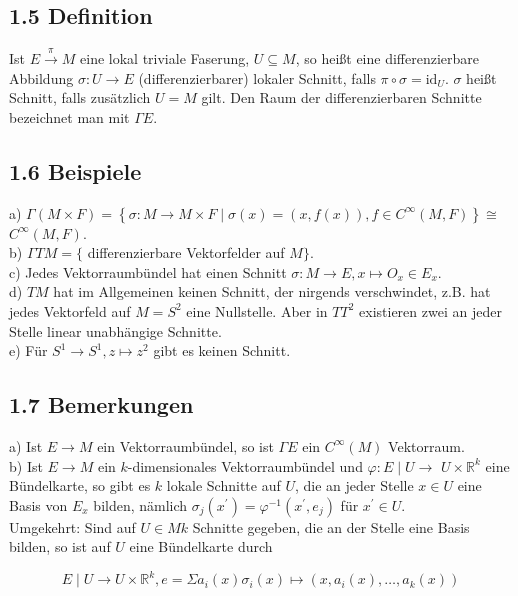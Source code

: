 \documentclass[10pt, letterpaper]{article}
\begin{document}
\subsection*{1.5 Definition}
Ist $E \xrightarrow{\pi} M$ eine lokal triviale Faserung, $U \subseteq M$, so heißt eine differenzierbare Abbildung $\sigma: U \rightarrow E$ (differenzierbarer) lokaler Schnitt, falls $\pi \circ \sigma=\mathrm{id}_{U}$. $\sigma$ heißt Schnitt, falls zusätzlich $U=M$ gilt. Den Raum der differenzierbaren Schnitte bezeichnet man mit $\Gamma E$.

\subsection*{1.6 Beispiele}
a) $\Gamma(M \times F)=\left\{\sigma: M \rightarrow M \times F \mid \sigma(x)=(x, f(x)), f \in C^{\infty}(M, F)\right\} \cong$ $C^{\infty}(M, F)$.\\
b) $\Gamma T M=\{$ differenzierbare Vektorfelder auf $M\}$.\\
c) Jedes Vektorraumbündel hat einen Schnitt $\sigma: M \rightarrow E, x \mapsto O_{x} \in E_{x}$.\\
d) $T M$ hat im Allgemeinen keinen Schnitt, der nirgends verschwindet, z.B. hat jedes Vektorfeld auf $M=S^{2}$ eine Nullstelle. Aber in $T T^{2}$ existieren zwei an jeder Stelle linear unabhängige Schnitte.\\
e) Für $S^{1} \rightarrow S^{1}, z \mapsto z^{2}$ gibt es keinen Schnitt.

\subsection*{1.7 Bemerkungen}
a) Ist $E \rightarrow M$ ein Vektorraumbündel, so ist $\Gamma E$ ein $C^{\infty}(M)$ Vektorraum.\\
b) Ist $E \rightarrow M$ ein $k$-dimensionales Vektorraumbündel und $\varphi: E \mid U \rightarrow$ $U \times \mathbb{R}^{k}$ eine Bündelkarte, so gibt es $k$ lokale Schnitte auf $U$, die an jeder Stelle $x \in U$ eine Basis von $E_{x}$ bilden, nämlich $\sigma_{j}\left(x^{\prime}\right)=\varphi^{-1}\left(x^{\prime}, e_{j}\right)$ für $x^{\prime} \in U$.\\
Umgekehrt: Sind auf $U \in M k$ Schnitte gegeben, die an der Stelle eine Basis bilden, so ist auf $U$ eine Bündelkarte durch

$$
E \mid U \rightarrow U \times \mathbb{R}^{k}, e=\Sigma a_{i}(x) \sigma_{i}(x) \mapsto\left(x, a_{i}(x), \ldots, a_{k}(x)\right)
$$
\end{document}
